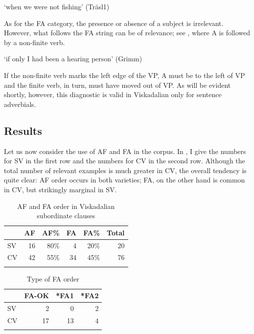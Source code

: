 \documentclass[output=paper,colorlinks,citecolor=brown,draft,draftmode]{langscibook}
\begin{document}
\glt `when we were not fishing’ (Träsl1)
\z

As for the FA category, the presence or absence of a subject is irrelevant. However, what follows the FA string can be of relevance; see , where A is followed by a non-finite verb.


\glt `if only I had been a hearing person’ (Grimm)
\z


If the non-finite verb marks the left edge of the VP, A must be to the left of VP and the finite verb, in turn, must have moved out of VP. As will be evident shortly, however, this diagnostic is valid in Viskadalian only for sentence adverbials.


\subsection{Results}\label{sec:petzell:2.4}


Let us now consider the use of AF and FA in the corpus. In , I give the numbers for SV in the first row and the numbers for CV in the second row. Although the total number of relevant examples is much greater in CV, the overall tendency is quite clear: AF order occurs in both varieties; FA, on the other hand is common in CV, but strikingly marginal in SV.


\begin{table}
\begin{tabular}{lrrrrr}
\lsptoprule
& AF & AF\% & FA & FA\% & Total\\\midrule
SV & 16 & 80\% & 4 & 20\% & 20\\
CV & 42 & 55\% & 34 & 45\% & 76\\
\lspbottomrule
\end{tabular}
\caption{\label{tab:petzell:1a}AF and FA order in Viskadalian subordinate clauses}
\end{table}

\begin{table}
\caption{\label{tab:petzell:1b}Type of FA order}
\begin{tabular}{lrrr}
\lsptoprule
& FA-OK & *FA1 & *FA2\\\midrule
SV & 2 & 0 & 2\\
CV & 17 & 13 & 4\\
\lspbottomrule
\end{tabular}
\end{table}
\end{document}
